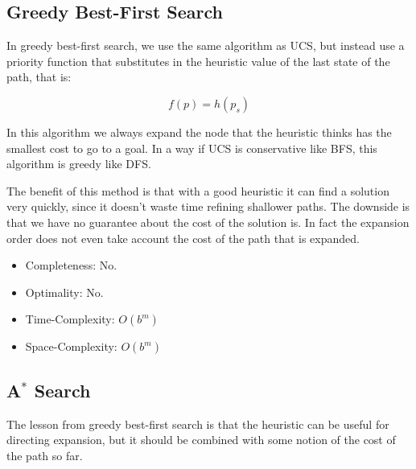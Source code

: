 \documentclass[11pt]{article}
\begin{document}







\subsection{Greedy Best-First Search}

In greedy best-first search, we use the same algorithm as UCS, but instead use a priority function that substitutes in the heuristic value of the last state of the path, that is: 

\[f(p) = h(p_s) \]  

In this algorithm we always expand the node that the heuristic thinks has the smallest cost to go to a goal. In a way if UCS is conservative like BFS, this algorithm is greedy like DFS.

The benefit of this method is that with a good heuristic it can find a solution very quickly, since it doesn't waste time refining shallower paths. The downside is that we have no guarantee about the cost of the solution is. In fact the expansion order does not even take account the cost of the path that is expanded. 
   

\begin{itemize}
\item Completeness: No.  
\item Optimality: No. 
\item Time-Complexity: $O(b^m)$
\item Space-Complexity: $O(b^m)$ 
\end{itemize}

\subsection{A$^*$ Search}

The lesson from greedy best-first search is that the heuristic can be useful for directing expansion, but it should be combined with some notion of the cost of the path so far. 
\end{document}
